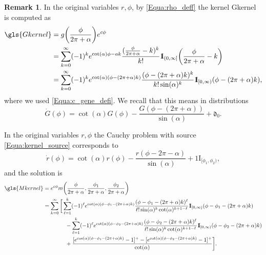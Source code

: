 \documentclass[reqno]{amsart}
\theoremstyle{definition} \newtheorem{definition}{Definition}[section]
\theoremstyle{definition} \newtheorem{remark}[definition]{Remark}
\theoremstyle{plain} \newtheorem{lemma}[definition]{Lemma}
\theoremstyle{plain} \newtheorem{proposition}[definition]{Proposition}
\theoremstyle{plain} \newtheorem{theorem}[definition]{Theorem}
\theoremstyle{plain} \newtheorem{corollary}[definition]{Corollary}
\theoremstyle{definition} \newtheorem{example}[definition]{Example}
\theoremstyle{plain} \newtheorem{claim}[clai]{Claim}
\theoremstyle{definition} \newtheorem{assumption}[definition]{Assumption}
\theoremstyle{definition} \newtheorem{observation}[definition]{Observation}
\newcommand{\ind}{1\!\!\mathrm{I}}
\newcommand{\1}{\mathbbm 1}
\newcommand{\Diracd}{\mathfrak{d}}
\numberwithin{equation}{section} %
\theoremstyle{plain} \newtheorem*{theorem*}{Theorem}
\theoremstyle{plain} \newtheorem{mthm}[maintheorem]{Main Theorem}
\theoremstyle{plain} \newtheorem*{mthm*}{Main Theorem}
\theoremstyle{plain} \newtheorem*{conjecture*}{Conjecture}
\theoremstyle{plain} \newtheorem{conjecture}[definition]{Conjecture}
\theoremstyle{plain} \newtheorem*{problem*}{Problem}
\begin{document}
\begin{remark}
\label{Rem:oringal_phi_kernel}
In the original variables $r,\phi$, by \eqref{Equa:rho_deff} the kernel  \gls{Gkernel} is computed as
\begin{align*}
\gls{Gkernel} &= g \bigg( \frac{\phi}{2\pi + \alpha} \bigg) e^{c \phi} \\
&= \sum_{k=0}^\infty (-1)^k e^{\cot(\alpha) \phi - a k} \frac{(\frac{\phi}{2\pi+\alpha} - k)^k}{k!} \ind_{(0,\infty]}\bigg( \frac{\phi}{2\pi+\alpha} - k \bigg) \\
&= \sum_{k=0}^\infty (-1)^k e^{\cot(\alpha)(\phi - (2\pi + \alpha) k)} \frac{(\phi - (2\pi + \alpha) k)^k}{k! \sin(\alpha)^k} \ind_{[0,\infty)}(\phi - (2\pi + \alpha)k),
\end{align*}
where we used \eqref{Equa:c_gene_defi}. We recall that this means in distributions
\begin{equation*}
\dot G(\phi) = \cot(\alpha) G(\phi) - \frac{G(\phi - (2\pi + \alpha))}{\sin(\alpha)} + \Diracd_0.
\end{equation*}

In the original variables $r,\phi$ the Cauchy problem with source \eqref{Equa:kernel_source} corresponds to
\begin{equation}
\label{Equa:diffuse_source}
\dot r(\phi) = \cot(\alpha) r(\phi) - \frac{r(\phi-2\pi - \alpha)}{\sin(\alpha)} + \ind_{[\phi_1,\phi_2)},
\end{equation}
and the solution is 
\begin{align*}
\gls{Mkernel} &= e^{c \phi} m \bigg( \frac{\phi}{2\pi + \alpha}, \frac{\phi_1}{2\pi + \alpha}, \frac{\phi_2}{2\pi + \alpha} \bigg) \\
&= \sum_{k=0}^\infty \bigg[ \sum_{\ell = 1}^k (-1)^\ell e^{\cot(\alpha) (\phi - \phi_1 - (2\pi + \alpha) k)} \frac{(\phi - \phi_1 - (2\pi + \alpha) k)^\ell}{\ell! \sin(\alpha)^k \cot(\alpha)^{k+1-\ell}} \ind_{[0,\infty)}(\phi - \phi_1 - (2\pi + \alpha) k) \\
& \qquad \qquad - \sum_{\ell = 1}^k (-1)^\ell e^{\cot(\alpha) (\phi - \phi_2 - (2\pi + \alpha) k)} \frac{(\phi - \phi_2 - (2\pi + \alpha) k)^\ell}{\ell! \sin(\alpha)^k \cot(\alpha)^{k+1-\ell}} \ind_{[0,\infty)}(\phi - \phi_2 - (2\pi + \alpha) k) \\
& \qquad \qquad + \frac{[ e^{\cos(\alpha) (\phi - \phi_1 - (2\pi + \alpha) k)} - 1 ]^+ - [ e^{\cot(\alpha) (\phi - \phi_2 - (2\pi + \alpha) k)} - 1 ]^+}{\cot(\alpha)} \bigg].
\end{align*}
\end{remark}
\end{document}
